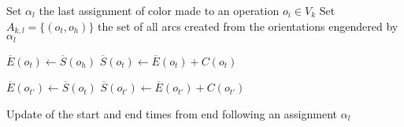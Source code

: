 \begin{algorithm}[htb]		
	Set $\alpha_l$ the last assignment of color made to an operation $o_i \in V_k$\;
	Set $A_{k,l} = \{(o_t,o_h)\}$ the set of all arcs created from the orientations engendered by $\alpha_l$\;
		{
				{
						{
							$\overline{E}(o_t) \leftarrow \overline{S}(o_h)$\;
							$\overline{S}(o_t) \leftarrow \overline{E}(o_t) + C(o_t)$\;
							\;
						}
					
				}
		}
		{
			{
						{
							{
								$\overline{E}(o_{t'}) \leftarrow \overline{S}(o_t)$\;
								$\overline{S}(o_{t'}) \leftarrow \overline{E}(o_{t'}) + C(o_{t'})$\;
								\;
							}
						}
			}
			 \KwRet\;
		}
	\caption{Update of the start and end times from end following an assignment $\alpha_l$}
	\label{algo:update_e}
\end{algorithm}

